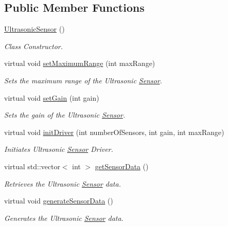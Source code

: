 \subsection*{Public Member Functions}
\begin{DoxyCompactItemize}
\item 
\hyperlink{classUltrasonicSensor_afc21cb39ba75dfd008e1e82c82d2e61f}{Ultrasonic\-Sensor} ()
\begin{DoxyCompactList}\small\item\em Class Constructor. \end{DoxyCompactList}\item 
virtual void \hyperlink{classUltrasonicSensor_aa825f00c93ee05ca0edbeb3a99f485b6}{set\-Maximum\-Range} (int max\-Range)
\begin{DoxyCompactList}\small\item\em Sets the maximum range of the Ultrasonic \hyperlink{classSensor}{Sensor}. \end{DoxyCompactList}\item 
virtual void \hyperlink{classUltrasonicSensor_a20010d13123da9fbf3efcdeb59d9f6a4}{set\-Gain} (int gain)
\begin{DoxyCompactList}\small\item\em Sets the gain of the Ultrasonic \hyperlink{classSensor}{Sensor}. \end{DoxyCompactList}\item 
virtual void \hyperlink{classUltrasonicSensor_a7e35552a5e39f38202c2a8650a90f43c}{init\-Driver} (int number\-Of\-Sensors, int gain, int max\-Range)
\begin{DoxyCompactList}\small\item\em Initiates Ultrasonic \hyperlink{classSensor}{Sensor} Driver. \end{DoxyCompactList}\item 
virtual std\-::vector$<$ int $>$ \hyperlink{classUltrasonicSensor_a4dab101931d788a031fe44db24d0c305}{get\-Sensor\-Data} ()
\begin{DoxyCompactList}\small\item\em Retrieves the Ultrasonic \hyperlink{classSensor}{Sensor} data. \end{DoxyCompactList}\item 
virtual void \hyperlink{classUltrasonicSensor_a5587d9432d42a82d9f6f853b0aecddd3}{generate\-Sensor\-Data} ()
\begin{DoxyCompactList}\small\item\em Generates the Ultrasonic \hyperlink{classSensor}{Sensor} data. \end{DoxyCompactList}\item 

\end{DoxyCompactItemize}
